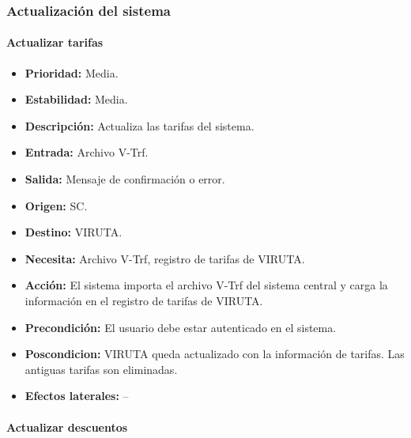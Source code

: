 \subsubsection{Actualización del sistema}

\paragraph{Actualizar tarifas}

\begin{itemize}
\item \textbf{Prioridad:} Media.
\item \textbf{Estabilidad:} Media.
\item \textbf{Descripción:} Actualiza las tarifas del sistema.
\item \textbf{Entrada:} Archivo V-Trf.
\item \textbf{Salida:} Mensaje de confirmación o error.
\item \textbf{Origen:} SC.
\item \textbf{Destino:} VIRUTA.
\item \textbf{Necesita:} Archivo V-Trf, registro de tarifas de VIRUTA.
\item \textbf{Acción:} El sistema importa el archivo V-Trf del sistema central y carga la información en el registro de tarifas de VIRUTA.
\item \textbf{Precondición:} El usuario debe estar autenticado en el sistema.
\item \textbf{Poscondicion:} VIRUTA queda actualizado con la información de tarifas. Las antiguas tarifas son eliminadas.
\item \textbf{Efectos laterales:} --
\end{itemize}

\paragraph{Actualizar descuentos}


